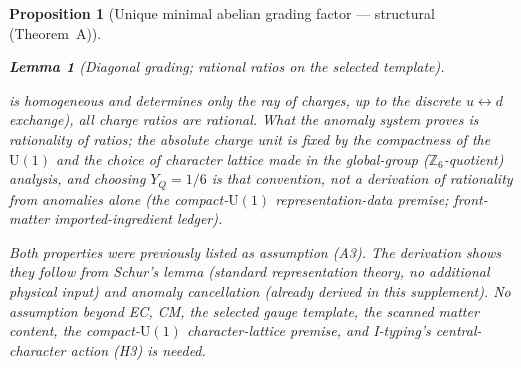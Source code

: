 \documentclass[11pt]{article}
\newtheorem{lemma}[theorem]{Lemma}
\newtheorem{proposition}[theorem]{Proposition}
\theoremstyle{definition}
\newcommand{\U}{\mathrm{U}}
\begin{document}
\begin{proposition}[Unique minimal abelian grading factor ---
structural (Theorem~A)]
\begin{lemma}[Diagonal grading; rational ratios on the selected template]
\begin{enumerate}[label=(\alph*),nosep]
  is homogeneous and determines only the ray of charges, up to the
  discrete $u \leftrightarrow d$ exchange), all charge \emph{ratios}
  are rational.  What the anomaly system proves is rationality of
  ratios; the absolute charge unit is fixed by the compactness of the
  $\U(1)$ and the choice of character lattice made in the global-group
  ($\mathbb{Z}_6$-quotient) analysis, and choosing $Y_Q = 1/6$ is that
  convention, not a derivation of rationality from anomalies alone
  (the compact-$\U(1)$ representation-data premise; front-matter
  imported-ingredient ledger).
\end{enumerate}
\end{lemma}

\noindent Both properties were previously listed as assumption (A3).
The derivation shows they follow from Schur's lemma (standard
representation theory, no additional physical input) and anomaly
cancellation (already derived in this supplement).  No assumption
beyond EC, CM, the selected gauge template, the scanned matter
content, the compact-$\U(1)$ character-lattice premise, and
I-typing's central-character action (H3) is needed.


\end{proposition}
\end{document}
